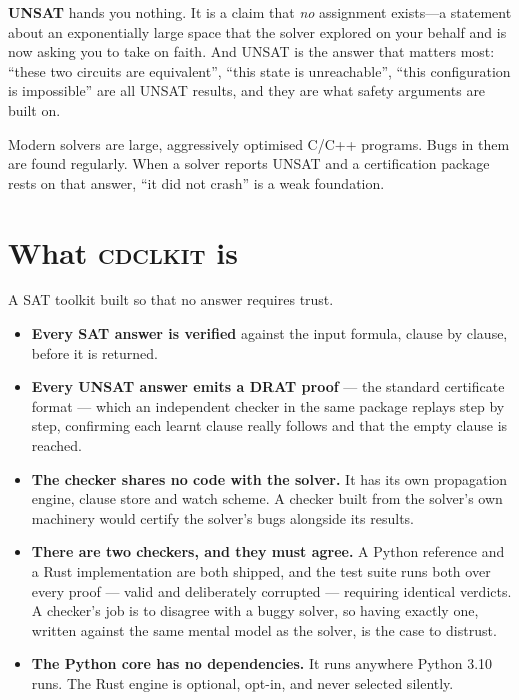 \documentclass[11pt,a4paper]{article}
\newcommand{\cdclkit}{\textsc{cdclkit}}
\begin{document}
\textbf{UNSAT} hands you nothing. It is a claim that \emph{no} assignment
exists---a statement about an exponentially large space that the solver
explored on your behalf and is now asking you to take on faith. And UNSAT is
the answer that matters most: ``these two circuits are equivalent'', ``this
state is unreachable'', ``this configuration is impossible'' are all UNSAT
results, and they are what safety arguments are built on.

Modern solvers are large, aggressively optimised C/C++ programs. Bugs in them
are found regularly. When a solver reports UNSAT and a certification package
rests on that answer, ``it did not crash'' is a weak foundation.

\section{What \cdclkit{} is}

A SAT toolkit built so that no answer requires trust.

\begin{itemize}
  \item \textbf{Every SAT answer is verified} against the input formula,
        clause by clause, before it is returned.
  \item \textbf{Every UNSAT answer emits a DRAT proof} --- the standard
        certificate format --- which an independent checker in the same
        package replays step by step, confirming each learnt clause really
        follows and that the empty clause is reached.
  \item \textbf{The checker shares no code with the solver.} It has its own
        propagation engine, clause store and watch scheme. A checker built from
        the solver's own machinery would certify the solver's bugs alongside
        its results.
  \item \textbf{There are two checkers, and they must agree.} A Python
        reference and a Rust implementation are both shipped, and the test
        suite runs both over every proof --- valid and deliberately corrupted
        --- requiring identical verdicts. A checker's job is to disagree with a
        buggy solver, so having exactly one, written against the same mental
        model as the solver, is the case to distrust.
  \item \textbf{The Python core has no dependencies.} It runs anywhere Python
        3.10 runs. The Rust engine is optional, opt-in, and never selected
        silently.
\end{itemize}
\end{document}
